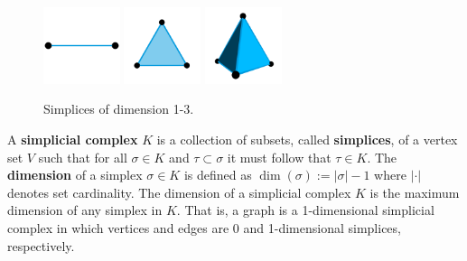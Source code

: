 

\begin{figure}[htbp]
  \centering
  \includegraphics[width=0.2\textwidth]{figures/edge.png}\hspace{3ex}
  \includegraphics[width=0.2\textwidth]{figures/tri.png}\hspace{3ex}
  \includegraphics[width=0.2\textwidth]{figures/tet.png}
  \caption{Simplices of dimension 1-3.}\label{fig:simplices}
\end{figure}

A \textbf{simplicial complex} $K$ is a collection of subsets, called \textbf{simplices}, of a vertex set $V$ such that for all $\sigma\in K$ and $\tau\subset\sigma$ it must follow that $\tau\in K$.
The \textbf{dimension} of a simplex $\sigma\in K$ is defined as $\dim(\sigma) := |\sigma|-1$ where $|\cdot|$ denotes set cardinality.
The dimension of a simplicial complex $K$ is the maximum dimension of any simplex in $K$.
That is, a graph is a 1-dimensional simplicial complex in which vertices and edges are 0 and 1-dimensional simplices, respectively.


